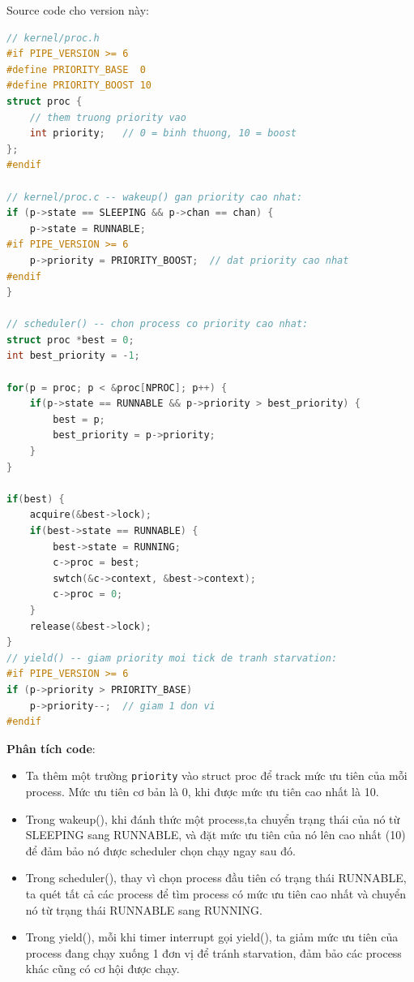 \documentclass[12pt,a4paper]{article}
\newcommand{\code}[1]{\texttt{#1}}
\newcommand{\tightlist}{\setlength{\itemsep}{2pt}\setlength{\parskip}{0pt}}
\begin{document}
Source code cho version này:
\begin{lstlisting}[caption={v6 -- Priority boost trong wakeup() và scheduler}, language=C]
// kernel/proc.h
#if PIPE_VERSION >= 6
#define PRIORITY_BASE  0
#define PRIORITY_BOOST 10
struct proc {
    // them truong priority vao
    int priority;   // 0 = binh thuong, 10 = boost
};
#endif

// kernel/proc.c -- wakeup() gan priority cao nhat:
if (p->state == SLEEPING && p->chan == chan) {
    p->state = RUNNABLE;
#if PIPE_VERSION >= 6
    p->priority = PRIORITY_BOOST;  // dat priority cao nhat
#endif
}

// scheduler() -- chon process co priority cao nhat:
struct proc *best = 0;
int best_priority = -1;

for(p = proc; p < &proc[NPROC]; p++) {
    if(p->state == RUNNABLE && p->priority > best_priority) {
        best = p;
        best_priority = p->priority;
    }
}

if(best) {
    acquire(&best->lock);
    if(best->state == RUNNABLE) {
        best->state = RUNNING;
        c->proc = best;
        swtch(&c->context, &best->context);
        c->proc = 0;
    }
    release(&best->lock);
}
// yield() -- giam priority moi tick de tranh starvation:
#if PIPE_VERSION >= 6
if (p->priority > PRIORITY_BASE)
    p->priority--;  // giam 1 don vi
#endif
\end{lstlisting}

\textbf{Phân tích code}:
\begin{itemize}\tightlist
    \item[+] Ta thêm một trường \code{priority} vào struct proc để track mức ưu tiên của mỗi process. Mức ưu tiên cơ bản là 0, khi được mức ưu tiên cao nhất là 10.
    \item[+] Trong wakeup(), khi đánh thức một process,ta chuyển trạng thái của nó từ SLEEPING sang RUNNABLE, và đặt mức ưu tiên của nó lên cao nhất (10) để đảm bảo nó được scheduler chọn chạy ngay sau đó.
    \item[+] Trong scheduler(), thay vì chọn process đầu tiên có trạng thái RUNNABLE, 
    ta quét tất cả các process để tìm process có mức ưu tiên cao nhất và chuyển nó từ trạng thái RUNNABLE sang RUNNING.
    \item[+] Trong yield(), mỗi khi timer interrupt gọi yield(), ta giảm mức ưu tiên của process đang chạy xuống 1 đơn vị để tránh starvation, đảm bảo các process khác cũng có cơ hội được chạy.
\end{itemize}
\end{document}
